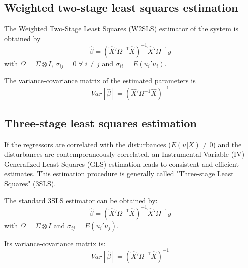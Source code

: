 \subsection{Weighted two-stage least squares estimation}

The Weighted Two-Stage Least Squares (W2SLS) estimator of the system 
is obtained by
\begin{equation}
   \widehat{\beta} = \left( \widehat{X}' \Omega^{-1} \widehat{X} 
   \right)^{-1} \widehat{X}' \Omega^{-1} y
\end{equation}
with $\Omega = \Sigma \otimes I$, 
$\sigma_{ij} = 0 \; \forall \; i \neq j$ and
$\sigma_{ii} = E \left( u_i' u_i \right)$.

The variance-covariance matrix of the estimated parameters is
\begin{equation}
   Var \left[ \widehat{\beta} \right] = \left( \widehat{X}' \Omega^{-1} 
   \widehat{X} \right)^{-1}
\end{equation}


\subsection{Three-stage least squares estimation}

If the regressors are correlated with the disturbances 
($E \left( u | X \right) \neq 0$) and 
the disturbances are contemporaneously correlated, 
an Instrumental Variable (IV) Generalized Least Squares (GLS) 
estimation leads to consistent and efficient estimates. This estimation 
procedure is generally called "Three-stage Least Squares" (3SLS). 

The standard 3SLS estimator can be obtained by:
\begin{equation}
   \widehat{\beta} = \left( \widehat{X}' \Omega^{-1} \widehat{X} 
   \right)^{-1} \widehat{X}' \Omega^{-1} y
\end{equation}
with $\Omega = \Sigma \otimes I$ and
$\sigma_{ij} = E \left( u_i' u_j \right)$.

Its variance-covariance matrix is:
\begin{equation}
   Var \left[ \widehat{\beta} \right] = \left( \widehat{X}' \Omega^{-1} 
   \widehat{X} \right)^{-1}
   \label{eq:cov3sls}
\end{equation}

